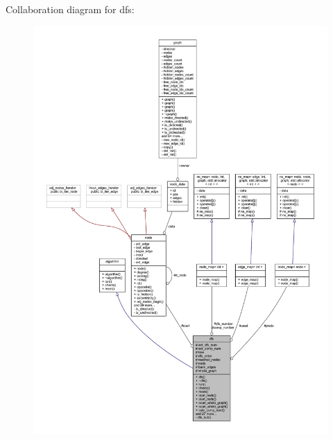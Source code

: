 Collaboration diagram for dfs\+:\nopagebreak
\begin{figure}[H]
\begin{center}
\leavevmode
\includegraphics[width=350pt]{classdfs__coll__graph}
\end{center}
\end{figure}
